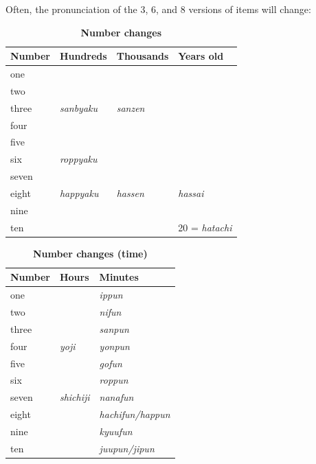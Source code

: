 \documentclass{proc}
\newcommand{\tab}[3][|r|l|]{
    {   %
        \begin{table}[H] %
        \caption*{\textbf{#2}}
        \vspace{-0.3cm} %
        \centering
        \begin{tabular}{#1}%
        \hline
        #3
        \end{tabular}
        \end{table}
    }
}
\begin{document}
{\par
Often, the pronunciation of the 3, 6, and 8 versions of items will change:
\tab[|l|l|l|l|]{Number changes}{
Number&Hundreds         & Thousands      & Years old   \\\hline
one   &                 &                &             \\\hline
two   &                 &                &             \\\hline
three &\textit{sanbyaku}& \textit{sanzen}&             \\\hline
four  &                 &                &             \\\hline
five  &                 &                &             \\\hline
six   &\textit{roppyaku}&                &             \\\hline
seven &                 &                &             \\\hline
eight &\textit{happyaku}& \textit{hassen}& \textit{hassai} \\\hline
nine  &                 &                &             \\\hline
ten   &                 &                & 20 = \textit{hatachi}\\\hline
}

\tab[|l|l|l|]{Number changes (time)}{
Number& Hours            & Minutes                  \\\hline
one   &                  & \textit{ippun}           \\\hline
two   &                  & \textit{nifun}           \\\hline
three &                  & \textit{sanpun}          \\\hline
four  &\textit{yoji}     & \textit{yonpun}          \\\hline
five  &                  & \textit{gofun}           \\\hline
six   &                  & \textit{roppun}          \\\hline
seven &\textit{shichiji} &\textit{nanafun}         \\\hline
eight &                  & \textit{hachifun/happun} \\\hline
nine  &                  & \textit{kyuufun}         \\\hline
ten   &                  & \textit{juupun/jipun}    \\\hline
}

}
\end{document}
